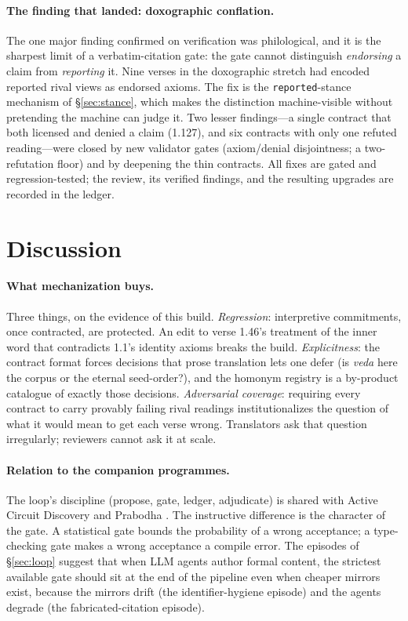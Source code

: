 \documentclass[11pt]{article}
\begin{document}
\paragraph{The finding that landed: doxographic conflation.} The one major
finding confirmed on verification was philological, and it is the sharpest
limit of a verbatim-citation gate: the gate cannot distinguish
\emph{endorsing} a claim from \emph{reporting} it. Nine verses in the
doxographic stretch had encoded reported rival views as endorsed axioms. The
fix is the \texttt{reported}-stance mechanism of \S\ref{sec:stance}, which
makes the distinction machine-visible without pretending the machine can
judge it. Two lesser findings---a single contract that both licensed and
denied a claim (1.127), and six contracts with only one refuted reading---were
closed by new validator gates (axiom/denial disjointness; a two-refutation
floor) and by deepening the thin contracts. All fixes are gated and
regression-tested; the review, its verified findings, and the resulting
upgrades are recorded in the ledger.

\section{Discussion}
\label{sec:discussion}

\paragraph{What mechanization buys.} Three things, on the evidence of this
build. \emph{Regression}: interpretive commitments, once contracted, are
protected. An edit to verse 1.46's treatment of the inner word that
contradicts 1.1's identity axioms breaks the build. \emph{Explicitness}: the
contract format forces decisions that prose translation lets one defer (is
\emph{veda} here the corpus or the eternal seed-order?), and the homonym
registry is a by-product catalogue of exactly those decisions.
\emph{Adversarial coverage}: requiring every contract to carry provably
failing rival readings institutionalizes the question of what it would mean
to get each verse wrong. Translators ask that question irregularly;
reviewers cannot ask it at scale.

\paragraph{Relation to the companion programmes.} The loop's discipline
(propose, gate, ledger, adjudicate) is shared with Active Circuit Discovery
and Prabodha \citep{sathish2026acd, sathish2026prabodha}. The instructive
difference is the character of the gate. A statistical gate bounds the
probability of a wrong acceptance; a type-checking gate makes a wrong
acceptance a compile error. The episodes of \S\ref{sec:loop} suggest that
when LLM agents author formal content, the strictest available gate should
sit at the end of the pipeline even when cheaper mirrors exist, because the
mirrors drift (the identifier-hygiene episode) and the agents degrade (the
fabricated-citation episode).
\end{document}
